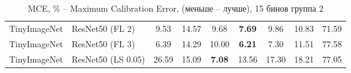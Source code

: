 \begin{table}[h!]
{\begin{tabular}{llccccccc}
TinyImageNet &             ResNet50 (FL 2) &                   9.53 &        14.57 &                   9.68 &  \textbf{7.69} &                   9.86 &                  10.83 &                  71.59 \\
TinyImageNet &             ResNet50 (FL 3) &                   6.39 &        14.29 &                  10.00 &  \textbf{6.21} &                   7.30 &                  11.51 &                  77.58 \\
TinyImageNet &          ResNet50 (LS 0.05) &                  26.59 &        15.09 &  \textbf{7.08} &                  13.56 &                  17.30 &                  18.21 &                  77.05 \\
\bottomrule
\end{tabular}%
}
\caption{MCE, \% -- Maximum Calibration Error, (меньше -- лучше), 15 бинов группа 2}
\label{tab:metrics:MCE_2}
\end{table}
